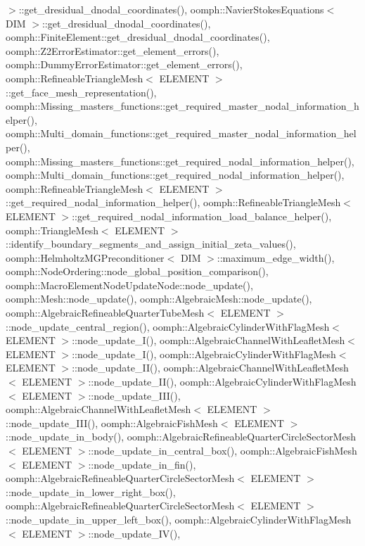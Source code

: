$>$\+::get\+\_\+dresidual\+\_\+dnodal\+\_\+coordinates(), oomph\+::\+Navier\+Stokes\+Equations$<$ D\+I\+M $>$\+::get\+\_\+dresidual\+\_\+dnodal\+\_\+coordinates(), oomph\+::\+Finite\+Element\+::get\+\_\+dresidual\+\_\+dnodal\+\_\+coordinates(), oomph\+::\+Z2\+Error\+Estimator\+::get\+\_\+element\+\_\+errors(), oomph\+::\+Dummy\+Error\+Estimator\+::get\+\_\+element\+\_\+errors(), oomph\+::\+Refineable\+Triangle\+Mesh$<$ E\+L\+E\+M\+E\+N\+T $>$\+::get\+\_\+face\+\_\+mesh\+\_\+representation(), oomph\+::\+Missing\+\_\+masters\+\_\+functions\+::get\+\_\+required\+\_\+master\+\_\+nodal\+\_\+information\+\_\+helper(), oomph\+::\+Multi\+\_\+domain\+\_\+functions\+::get\+\_\+required\+\_\+master\+\_\+nodal\+\_\+information\+\_\+helper(), oomph\+::\+Missing\+\_\+masters\+\_\+functions\+::get\+\_\+required\+\_\+nodal\+\_\+information\+\_\+helper(), oomph\+::\+Multi\+\_\+domain\+\_\+functions\+::get\+\_\+required\+\_\+nodal\+\_\+information\+\_\+helper(), oomph\+::\+Refineable\+Triangle\+Mesh$<$ E\+L\+E\+M\+E\+N\+T $>$\+::get\+\_\+required\+\_\+nodal\+\_\+information\+\_\+helper(), oomph\+::\+Refineable\+Triangle\+Mesh$<$ E\+L\+E\+M\+E\+N\+T $>$\+::get\+\_\+required\+\_\+nodal\+\_\+information\+\_\+load\+\_\+balance\+\_\+helper(), oomph\+::\+Triangle\+Mesh$<$ E\+L\+E\+M\+E\+N\+T $>$\+::identify\+\_\+boundary\+\_\+segments\+\_\+and\+\_\+assign\+\_\+initial\+\_\+zeta\+\_\+values(), oomph\+::\+Helmholtz\+M\+G\+Preconditioner$<$ D\+I\+M $>$\+::maximum\+\_\+edge\+\_\+width(), oomph\+::\+Node\+Ordering\+::node\+\_\+global\+\_\+position\+\_\+comparison(), oomph\+::\+Macro\+Element\+Node\+Update\+Node\+::node\+\_\+update(), oomph\+::\+Mesh\+::node\+\_\+update(), oomph\+::\+Algebraic\+Mesh\+::node\+\_\+update(), oomph\+::\+Algebraic\+Refineable\+Quarter\+Tube\+Mesh$<$ E\+L\+E\+M\+E\+N\+T $>$\+::node\+\_\+update\+\_\+central\+\_\+region(), oomph\+::\+Algebraic\+Cylinder\+With\+Flag\+Mesh$<$ E\+L\+E\+M\+E\+N\+T $>$\+::node\+\_\+update\+\_\+\+I(), oomph\+::\+Algebraic\+Channel\+With\+Leaflet\+Mesh$<$ E\+L\+E\+M\+E\+N\+T $>$\+::node\+\_\+update\+\_\+\+I(), oomph\+::\+Algebraic\+Cylinder\+With\+Flag\+Mesh$<$ E\+L\+E\+M\+E\+N\+T $>$\+::node\+\_\+update\+\_\+\+I\+I(), oomph\+::\+Algebraic\+Channel\+With\+Leaflet\+Mesh$<$ E\+L\+E\+M\+E\+N\+T $>$\+::node\+\_\+update\+\_\+\+I\+I(), oomph\+::\+Algebraic\+Cylinder\+With\+Flag\+Mesh$<$ E\+L\+E\+M\+E\+N\+T $>$\+::node\+\_\+update\+\_\+\+I\+I\+I(), oomph\+::\+Algebraic\+Channel\+With\+Leaflet\+Mesh$<$ E\+L\+E\+M\+E\+N\+T $>$\+::node\+\_\+update\+\_\+\+I\+I\+I(), oomph\+::\+Algebraic\+Fish\+Mesh$<$ E\+L\+E\+M\+E\+N\+T $>$\+::node\+\_\+update\+\_\+in\+\_\+body(), oomph\+::\+Algebraic\+Refineable\+Quarter\+Circle\+Sector\+Mesh$<$ E\+L\+E\+M\+E\+N\+T $>$\+::node\+\_\+update\+\_\+in\+\_\+central\+\_\+box(), oomph\+::\+Algebraic\+Fish\+Mesh$<$ E\+L\+E\+M\+E\+N\+T $>$\+::node\+\_\+update\+\_\+in\+\_\+fin(), oomph\+::\+Algebraic\+Refineable\+Quarter\+Circle\+Sector\+Mesh$<$ E\+L\+E\+M\+E\+N\+T $>$\+::node\+\_\+update\+\_\+in\+\_\+lower\+\_\+right\+\_\+box(), oomph\+::\+Algebraic\+Refineable\+Quarter\+Circle\+Sector\+Mesh$<$ E\+L\+E\+M\+E\+N\+T $>$\+::node\+\_\+update\+\_\+in\+\_\+upper\+\_\+left\+\_\+box(), oomph\+::\+Algebraic\+Cylinder\+With\+Flag\+Mesh$<$ E\+L\+E\+M\+E\+N\+T $>$\+::node\+\_\+update\+\_\+\+I\+V(), 